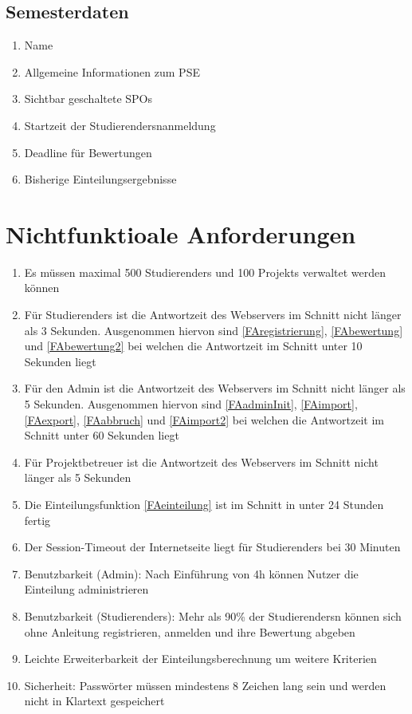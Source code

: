 \documentclass[parskip=full]{scrartcl}
\newcommand{\swtLabel}[1]{\textbf{/#1\arabic*0/}}
\begin{document}
\subsection{Semesterdaten}
\begin{enumerate}[label=\swtLabel{D}, resume]
    \item Name
    \item Allgemeine Informationen zum \gls{PSE}
    \item Sichtbar geschaltete \glspl{SPO}
    \item Startzeit der \glspl{Studierender}nanmeldung
    \item Deadline für \gls{Bewertung}en
    \item Bisherige \gls{Einteilung}sergebnisse
\end{enumerate}

\section{Nichtfunktioale Anforderungen}

\begin{enumerate}[label=\swtLabel{NF}]
  \item Es müssen maximal 500 \glspl{Studierender} und 100 \glspl{Projekt} verwaltet werden
  können
  \item Für \glspl{Studierender} ist die Antwortzeit des Webservers im Schnitt nicht
  länger als 3 Sekunden. Ausgenommen hiervon sind \ref{FAregistrierung}, 
  \ref{FAbewertung} und \ref{FAbewertung2} bei welchen die Antwortzeit im
  Schnitt unter 10 Sekunden liegt
  \item Für den \gls{Admin} ist die Antwortzeit des Webservers im Schnitt nicht
  länger als 5 Sekunden. Ausgenommen hiervon sind \ref{FAadminInit}, \ref{FAimport},
  \ref{FAexport}, \ref{FAabbruch} und \ref{FAimport2} bei welchen die Antwortzeit im Schnitt
  unter 60 Sekunden liegt
  \item Für \gls{Projektbetreuer} ist die Antwortzeit des Webservers im Schnitt nicht
  länger als 5 Sekunden
  \item Die \gls{Einteilung}sfunktion \ref{FAeinteilung} ist im Schnitt in unter 24
  Stunden fertig
	\item Der Session-Timeout der Internetseite liegt für \glspl{Studierender} bei 30
	Minuten
	\item Benutzbarkeit (\gls{Admin}): Nach Einführung von 4h können Nutzer die
	\gls{Einteilung} administrieren
	\item Benutzbarkeit (\glspl{Studierender}): Mehr als 90\% der \glspl{Studierender}n können
	sich ohne Anleitung registrieren, anmelden und ihre \gls{Bewertung} abgeben
	\item Leichte Erweiterbarkeit der \gls{Einteilung}sberechnung um weitere Kriterien
	\item Sicherheit: Passwörter müssen mindestens 8 Zeichen lang sein und werden
	nicht in Klartext gespeichert
 

\end{enumerate}
\end{document}
